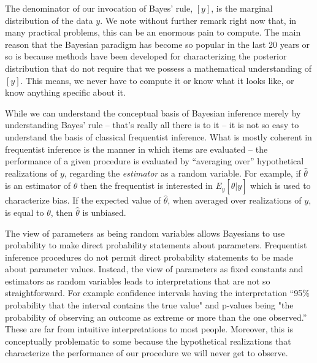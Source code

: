 The denominator of our invocation of Bayes' rule, $[y]$,
is the marginal distribution of the data $y$.  We note without further
remark right now that, in many practical problems, this can be an
enormous pain to compute. The main reason that the Bayesian paradigm
has become so popular in the last 20 years or so is because methods
have been developed
for characterizing the posterior distribution that do not
require that we possess a mathematical understanding of $[y]$. This means,
we never have to compute it or know what it looks like, or know
anything specific about it.



While we can understand the conceptual basis of Bayesian inference
merely by understanding Bayes' rule -- that's really all there is to it
-- it is not so easy to understand the basis of classical
frequentist inference. 
What is mostly coherent
in frequentist inference is the manner in which items are evaluated -- the performance of a given procedure is
evaluated by ``averaging over'' hypothetical realizations of $y$,
regarding the {\it estimator} as a random variable. For example, if
$\hat{\theta}$ is an estimator of $\theta$ then the frequentist is
interested in $E_{y}[\hat{\theta}|y]$ which is used to characterize
bias. If the expected value of $\hat{\theta}$, when averaged over
realizations of $y$, is equal to $\theta$, then $\hat{\theta}$ is
unbiased.

The view of parameters as being random variables 
allows Bayesians to use probability to make direct probability
statements about parameters. Frequentist inference procedures do not
permit direct probability statements to be made about parameter
values.
Instead, 
the view of parameters as fixed constants and estimators as random variables
leads to interpretations that are not so straightforward. For
example confidence intervals having the interpretation ``95\%
probability that the interval contains the true value" and p-values
being "the probability of observing an outcome as extreme or more than
the one observed.'' These are far from intuitive interpretations to
most people.  Moreover, this is conceptually problematic to some
because the hypothetical realizations that characterize the
performance of our procedure we will never get to observe.

